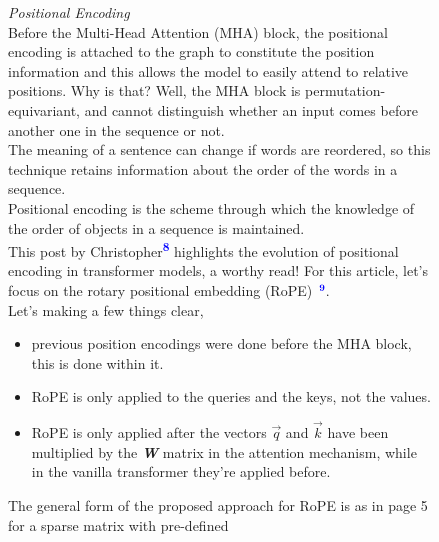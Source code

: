\documentclass[12pt]{article}
\newcommand{\customtext}[3]{%
    \vspace{#2} %
    \fontsize{13}{8}\textcolor{#1}{\textit{#3}}%
}
\newcommand{\bandi}[1]{\textbf{\textit{#1}}}
\newcommand{\sidecite}[1]{\textsuperscript{\textcolor{blue}{\textbf{\scriptsize#1}}}}
\begin{document}
\begin{figure}[!htb]
    \begin{minipage}[t]{0.65\textwidth}
    \raggedright
    \customtext{xtitle}{0em}{Positional Encoding}\\
    Before the Multi-Head Attention (MHA) block, the positional encoding is attached to the graph to constitute the position information and 
    this allows the model to easily attend to relative positions.
    Why is that? Well, the MHA block is permutation-equivariant, and cannot distinguish whether an input comes before another one in the 
    sequence or not.\\
    The meaning of a sentence can change if words are reordered, so this technique retains information about the order of the words in a sequence.\\
    Positional encoding is the scheme through which the knowledge of the order of objects in a sequence is maintained.\\
    This post by Christopher\sidecite{8} highlights the evolution of positional encoding in transformer models, a worthy read! For this article, 
    let's focus on the rotary positional embedding (RoPE){\scriptsize\ \textcolor{blue}{$\mathbf{^9}$}}.\\    
    Let's making a few things clear, 
    \begin{itemize}[left=0pt,topsep=0pt,itemsep=-1ex,parsep=0ex]
        \item previous position encodings were done before the MHA block, this is done within it.
        \item RoPE is only applied to the queries and the keys, not the values. 
        \item RoPE is only applied after the vectors $\vec{q}$ and $\vec{k}$ have been multiplied by the 
        \bandi{W} matrix in the attention mechanism, while in the vanilla transformer they're applied before.
      \end{itemize}
    \vspace{1em}
    The general form of the proposed approach for RoPE is as in page 5 for a sparse matrix with pre-defined 

\end{minipage}
\end{figure}
\end{document}
